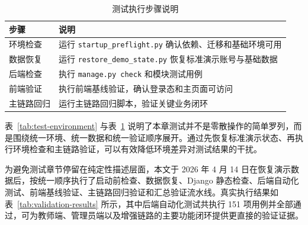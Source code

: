 \documentclass[12pt,a4paper]{ctexbook}
\begin{document}
\begin{table}[H]
  \centering
  \small
  \caption{测试执行步骤说明}
  \label{tab:test-steps}
  \begin{tabular}{p{2.4cm}p{8.8cm}}
    \toprule
    步骤 & 说明 \\
    \midrule
    环境检查 & 运行 \texttt{startup\_preflight.py} 确认依赖、迁移和基础环境可用 \\
    数据恢复 & 运行 \texttt{restore\_demo\_state.py} 恢复标准演示账号与基础数据 \\
    后端检查 & 执行 \texttt{manage.py check} 和模块测试用例 \\
    前端验证 & 执行前端基线验证，确认登录态和主页面可访问 \\
    主链路回归 & 运行主链路回归脚本，验证关键业务闭环 \\
    \bottomrule
  \end{tabular}
\end{table}

表~\ref{tab:test-environment} 与表~\ref{tab:test-steps} 说明了本章测试并不是零散操作的简单罗列，而是围绕统一环境、统一数据和统一验证顺序展开。通过先恢复标准演示状态、再执行环境检查和主链路验证，可以有效降低环境差异对测试结果的干扰。

为避免测试章节停留在纯定性描述层面，本文于 2026 年 4 月 14 日在恢复演示数据后，按统一顺序执行了启动前检查、数据恢复、Django 静态检查、后端自动化测试、前端基线验证、主链路回归验证和汇总验证流水线。真实执行结果如表~\ref{tab:validation-results} 所示，其中后端自动化测试共执行 151 项用例并全部通过，可为教师端、管理员端以及增强链路的主要功能闭环提供更直接的验证证据。
\end{document}
